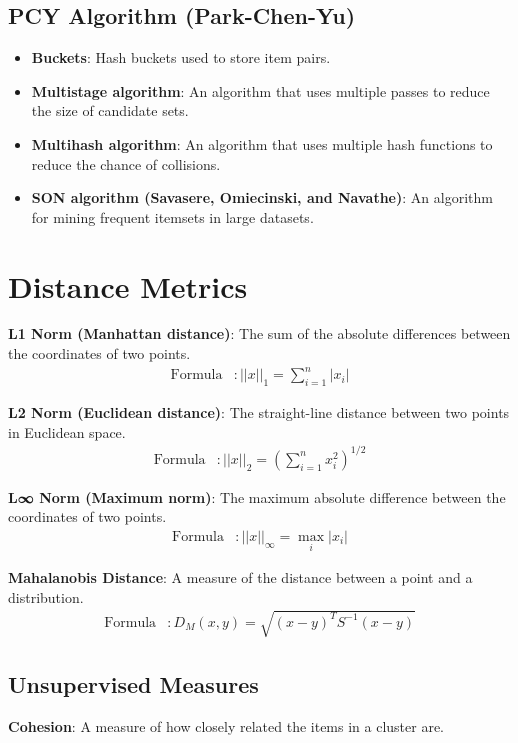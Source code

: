 \documentclass{article}
\begin{document}
\subsection{PCY Algorithm (Park-Chen-Yu)}
\begin{itemize}
    \item \textbf{Buckets}: Hash buckets used to store item pairs.
    \item \textbf{Multistage algorithm}: An algorithm that uses multiple passes to reduce the size of candidate sets.
    \item \textbf{Multihash algorithm}: An algorithm that uses multiple hash functions to reduce the chance of collisions.
    \item \textbf{SON algorithm (Savasere, Omiecinski, and Navathe)}: An algorithm for mining frequent itemsets in large datasets.
\end{itemize}

\section{Distance Metrics}

\textbf{L1 Norm (Manhattan distance)}: The sum of the absolute differences between the coordinates of two points.
\begin{align*}
    \text{Formula} &: ||x||_1 = \sum_{i=1}^{n} |x_i|
\end{align*}

\textbf{L2 Norm (Euclidean distance)}: The straight-line distance between two points in Euclidean space.
\begin{align*}
    \text{Formula} &: ||x||_2 = \left( \sum_{i=1}^{n} x_i^2 \right)^{1/2}
\end{align*}

\textbf{L∞ Norm (Maximum norm)}: The maximum absolute difference between the coordinates of two points.
\begin{align*}
    \text{Formula} &: ||x||_\infty = \max_i |x_i|
\end{align*}

\textbf{Mahalanobis Distance}: A measure of the distance between a point and a distribution.
\begin{align*}
    \text{Formula} &: D_M(x, y) = \sqrt{(x - y)^T S^{-1} (x - y)}
\end{align*}

\subsection{Unsupervised Measures}
\textbf{Cohesion}: A measure of how closely related the items in a cluster are.
\end{document}
